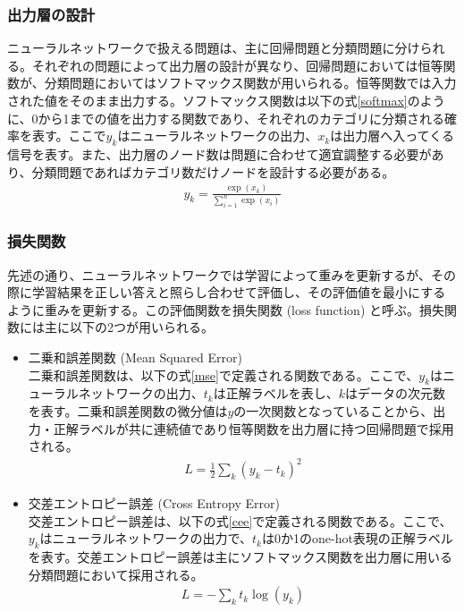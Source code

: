 \subsubsection{出力層の設計}
ニューラルネットワークで扱える問題は、主に回帰問題と分類問題に分けられる。それぞれの問題によって出力層の設計が異なり、回帰問題においては恒等関数が、分類問題においてはソフトマックス関数が用いられる。恒等関数では入力された値をそのまま出力する。ソフトマックス関数は以下の式\ref{softmax}のように、0から1までの値を出力する関数であり、それぞれのカテゴリに分類される確率を表す。ここで$y_k$はニューラルネットワークの出力、$x_k$は出力層へ入ってくる信号を表す。また、出力層のノード数は問題に合わせて適宜調整する必要があり、分類問題であればカテゴリ数だけノードを設計する必要がある。
\begin{align}
\label{softmax}
y_k = \frac{\exp(x_k)}{\sum_{i=1}^n \exp(x_i)}
\end{align}

\subsubsection{損失関数}
先述の通り、ニューラルネットワークでは学習によって重みを更新するが、その際に学習結果を正しい答えと照らし合わせて評価し、その評価値を最小にするように重みを更新する。この評価関数を損失関数 (loss function) と呼ぶ。損失関数には主に以下の2つが用いられる。
\begin{itemize}
	\item 二乗和誤差関数  (Mean Squared Error) \\
		二乗和誤差関数は、以下の式\ref{mse}で定義される関数である。ここで、$y_k$はニューラルネットワークの出力、$t_k$は正解ラベルを表し、$k$はデータの次元数を表す。二乗和誤差関数の微分値は$y$の一次関数となっていることから、出力・正解ラベルが共に連続値であり恒等関数を出力層に持つ回帰問題で採用される。
		\begin{align}
			\label{mse}
			L = \frac{1}{2}\sum_k {(y_k-t_k)}^2
		\end{align}
	\item 交差エントロピー誤差 (Cross Entropy Error) \\
		交差エントロピー誤差は、以下の式\ref{cee}で定義される関数である。ここで、$y_k$はニューラルネットワークの出力で、$t_k$は0か1のone-hot表現の正解ラベルを表す。交差エントロピー誤差は主にソフトマックス関数を出力層に用いる分類問題において採用される。
		\begin{align}
			\label{cee}
			L = - \sum_k t_k \log(y_k)
		\end{align}
\end{itemize}

